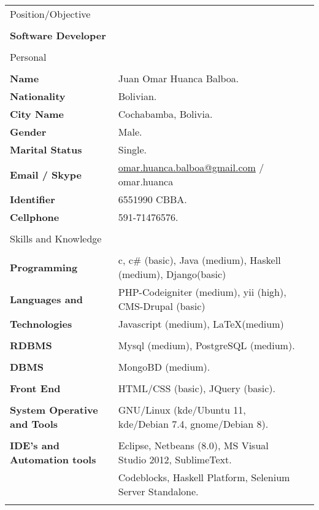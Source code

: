 \documentclass[letterpaper,11pt,oneside]{article}
\begin{document}
\begin{tabular}{l l l}
 \Large{\textcolor{mygray}{Position/Objective}} \\ 
 	\\ 
 \textbf{Software Developer} \\
	\\	
 \Large{\textcolor{mygray}{Personal}} \\
 	\\
 	\textbf{Name}    		& Juan Omar Huanca Balboa. \\
 	\textbf{Nationality}	& Bolivian.   \\
 	\textbf{City Name} 		& Cochabamba, Bolivia. \\
 	\textbf{Gender} 		& Male. \\
 	\textbf{Marital Status}	& Single. \\	 
 	\textbf{Email / Skype} 	& \href{mailto:omar.huanca.balboa@gmail.com} 		{omar.huanca.balboa@gmail.com} / omar.huanca \\
 	\textbf{Identifier}		& 6551990 CBBA. \\
 	\textbf{Cellphone}		& 591-71476576. \\
 	\\
 \Large{\textcolor{mygray}{Skills and Knowledge}}   \\
	\\
 	\textbf{Programming}		& c, c\# (basic), Java (medium), Haskell (medium), Django(basic)\\ 
 	\textbf{Languages and} 		& PHP-Codeigniter (medium), yii (high), CMS-Drupal (basic)\\ 		
	\textbf{Technologies}		& Javascript (medium), \LaTeX (medium) \\
	\\
	\textbf{RDBMS}				& Mysql (medium), PostgreSQL (medium).\\
	\\	
	\textbf{DBMS}				& MongoBD (medium). \\	
	\\
	\textbf{Front End}			& HTML/CSS (basic), JQuery (basic). \\
	\\
	\textbf{System Operative and Tools}	& GNU/Linux (kde/Ubuntu 11, kde/Debian 7.4, gnome/Debian 8). \\
	\\	
	\textbf{IDE's and Automation tools}	& Eclipse, Netbeans (8.0), MS Visual Studio 2012, SublimeText. \\
										& Codeblocks, Haskell Platform, Selenium Server Standalone.\\
	\\

\end{tabular}
\end{document}
